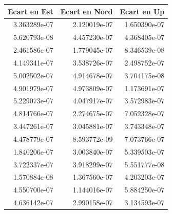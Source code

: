 \begin{tabular}{rrr}
\toprule
Ecart en Est & Ecart en Nord &  Ecart en Up \\
\midrule
3.363289e-07 &  2.120019e-07 & 1.650390e-07 \\
5.620793e-08 &  4.457230e-07 & 4.368405e-07 \\
2.461586e-07 &  1.779045e-07 & 8.346539e-08 \\
4.149341e-07 &  3.538726e-07 & 2.498752e-07 \\
5.002502e-07 &  4.914678e-07 & 3.704175e-08 \\
4.901979e-07 &  4.973809e-07 & 1.173691e-07 \\
5.229073e-07 &  4.047917e-07 & 3.572983e-07 \\
4.814766e-07 &  2.274675e-07 & 7.052328e-07 \\
3.447261e-07 &  3.045881e-07 & 3.743348e-07 \\
4.478779e-07 &  8.593772e-09 & 7.073766e-07 \\
1.840206e-07 &  3.003840e-07 & 5.339503e-07 \\
3.722337e-07 &  3.918299e-07 & 5.551777e-08 \\
1.570884e-08 &  1.367560e-07 & 4.203203e-07 \\
4.550700e-07 &  1.144016e-07 & 5.884250e-07 \\
4.636142e-07 &  2.990158e-07 & 3.134593e-07 \\
\bottomrule
\end{tabular}
